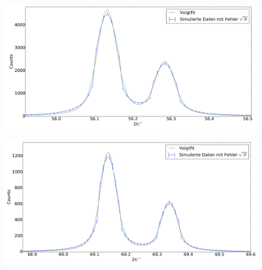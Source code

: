 \begin{figure}[H]
\begin{minipage}{.52\textwidth}
  \centering
  \includegraphics[scale=0.18]{Simulation_Siliciumpulver_3}
  \label{fig:pul_sim_sil_3}
\end{minipage}
\hspace{0.2cm}
\begin{minipage}{.5\textwidth}
  \centering
  \includegraphics[scale=0.18]{Simulation_Siliciumpulver_4}
  \label{fig:pul_sim_sil_4}
\end{minipage}
\end{figure}
